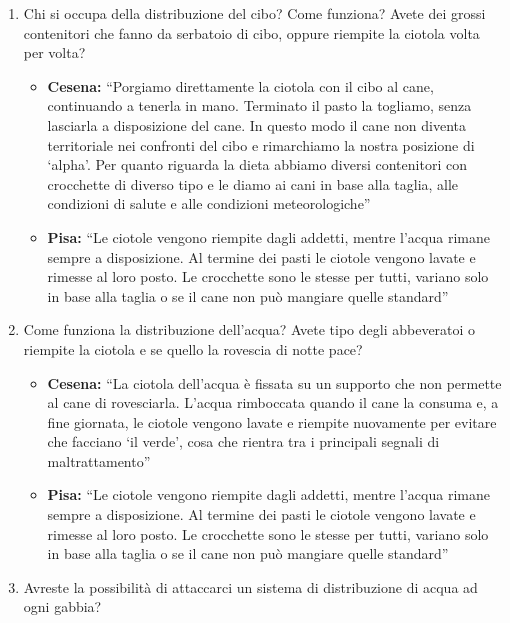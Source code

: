 \documentclass{report}
\begin{document}
\begin{enumerate}
\def\labelenumi{\arabic{enumi}.}
\item
  Chi si occupa della distribuzione del cibo? Come funziona? Avete dei
  grossi contenitori che fanno da serbatoio di cibo, oppure riempite la
  ciotola volta per volta?

  \begin{itemize}
  \tightlist
  \item
    \textbf{Cesena:} ``Porgiamo direttamente la ciotola con il cibo al
    cane, continuando a tenerla in mano. Terminato il pasto la togliamo,
    senza lasciarla a disposizione del cane. In questo modo il cane non
    diventa territoriale nei confronti del cibo e rimarchiamo la nostra
    posizione di `alpha'. Per quanto riguarda la dieta abbiamo diversi
    contenitori con crocchette di diverso tipo e le diamo ai cani in
    base alla taglia, alle condizioni di salute e alle condizioni
    meteorologiche''
  \item
    \textbf{Pisa: }``Le ciotole vengono riempite dagli addetti, mentre
    l'acqua rimane sempre a disposizione. Al termine dei pasti le
    ciotole vengono lavate e rimesse al loro posto. Le crocchette sono
    le stesse per tutti, variano solo in base alla taglia o se il cane
    non può mangiare quelle standard''
  \end{itemize}
\item
  Come funziona la distribuzione dell'acqua? Avete tipo degli
  abbeveratoi o riempite la ciotola e se quello la rovescia di notte
  pace?

  \begin{itemize}
  \tightlist
  \item
    \textbf{Cesena:} ``La ciotola dell'acqua è fissata su un supporto
    che non permette al cane di rovesciarla. L'acqua rimboccata quando
    il cane la consuma e, a fine giornata, le ciotole vengono lavate e
    riempite nuovamente per evitare che facciano `il verde', cosa che
    rientra tra i principali segnali di maltrattamento''
  \item
    \textbf{Pisa: }``Le ciotole vengono riempite dagli addetti, mentre
    l'acqua rimane sempre a disposizione. Al termine dei pasti le
    ciotole vengono lavate e rimesse al loro posto. Le crocchette sono
    le stesse per tutti, variano solo in base alla taglia o se il cane
    non può mangiare quelle standard''
  \end{itemize}
\item
  Avreste la possibilità di attaccarci un sistema di distribuzione di
  acqua ad ogni gabbia?


\end{enumerate}
\end{document}

